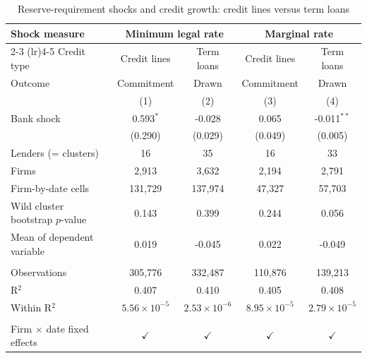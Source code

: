 
\begin{table}[!h]
   \centering
   \small
   \begin{threeparttable}[b]
      \caption{\label{tab:encaje_loan_growth} Reserve-requirement shocks and credit growth: credit lines versus term loans}
      \bigskip
      \begin{tabular}{lcccc}
         \toprule
         Shock measure & \multicolumn{2}{c}{Minimum legal rate} & \multicolumn{2}{c}{Marginal rate} \\ 
         \cmidrule(lr){2-3} \cmidrule(lr){4-5}
         Credit type                       & Credit lines          & Term loans            & Credit lines          & Term loans \\   
         Outcome                           & Commitment            & Drawn                 & Commitment            & Drawn \\   
                                           & (1)                   & (2)                   & (3)                   & (4)\\  
         \midrule 
         Bank shock                        & 0.593$^{*}$           & -0.028                & 0.065                 & -0.011$^{**}$\\   
                                           & (0.290)               & (0.029)               & (0.049)               & (0.005)\\   
         Lenders (= clusters)              & 16                    & 35                    & 16                    & 33\\  
         Firms                             & 2,913                 & 3,632                 & 2,194                 & 2,791\\  
         Firm-by-date cells                & 131,729               & 137,974               & 47,327                & 57,703\\  
         Wild cluster bootstrap $p$-value  & 0.143                 & 0.399                 & 0.244                 & 0.056\\  
         Mean of dependent variable        & 0.019                 & -0.045                & 0.022                 & -0.049\\  
          \\
         Observations                      & 305,776               & 332,487               & 110,876               & 139,213\\  
         R$^2$                             & 0.407                 & 0.410                 & 0.405                 & 0.408\\  
         Within R$^2$                      & $5.56\times 10^{-5}$  & $2.53\times 10^{-6}$  & $8.95\times 10^{-5}$  & $2.79\times 10^{-5}$\\   
          \\
         Firm $\times$ date fixed effects  & $\checkmark$          & $\checkmark$          & $\checkmark$          & $\checkmark$\\   
         \bottomrule
      \end{tabular}
      

\end{threeparttable}
\end{table}
